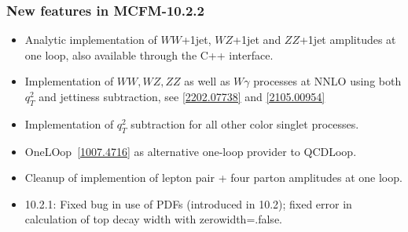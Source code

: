 \subsubsection*{New features in MCFM-10.2.2}
\begin{itemize}
\item Analytic implementation of $WW$+1jet, $WZ$+1jet and $ZZ$+1jet amplitudes at one loop, also available through the C++ interface.
\item Implementation of $WW,WZ,ZZ$ as well as $W\gamma$ processes at NNLO using both $q_T^2$ and jettiness subtraction, see
\href{https://arxiv.org/abs/2202.07738}{[2202.07738]} and \href{https://arxiv.org/abs/2105.00954}{[2105.00954]}
\item Implementation of $q_T^2$ subtraction for all other color singlet processes.
\item OneLOop~\href{https://arxiv.org/abs/1007.4716}{[1007.4716]} as alternative one-loop provider to QCDLoop.
\item Cleanup of implemention of lepton pair + four parton amplitudes at one loop.
\item 10.2.1: Fixed bug in use of PDFs (introduced in 10.2); fixed error in calculation of top decay width with zerowidth=.false.
\end{itemize}

